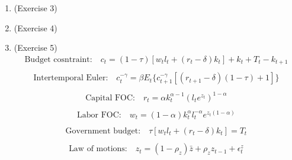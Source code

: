 \documentclass[letterpaper,12pt]{article}
\theoremstyle{definition}
\begin{document}
\begin{enumerate}
	\item(Exercise 3)\\
	
	\item(Exercise 4)\\

	\item(Exercise 5)\\
	\begin{equation} \label{eq1}
	\begin{split}
	\text{Budget cosntraint:} \quad c_{t} = (1 - \tau)[w_{t}l_{t} + (r_{t} - \delta)k_{t}] + k_{t} + T_{t} - k_{t + 1}\\
	\end{split}
	\end{equation}
	\begin{equation} \label{eq2}
	\begin{split}
	\text{Intertemporal Euler:} \quad c_{t}^{-\gamma} = \beta E_{t}\{  c_{t + 1}^{-\gamma}[(r_{t + 1} - \delta)(1 - \tau) + 1]\} \\
	\end{split}
	\end{equation}
	\begin{equation} \label{eq3}
	\begin{split}
	\text{Capital FOC:} \quad r_{t} = \alpha k_{t}^{\alpha - 1} (l_{t}e^{z_{t}})^{1 - \alpha} \\
	\end{split}
	\end{equation}
	\begin{equation} \label{eq4}
	\begin{split}
	\text{Labor FOC:} \quad w_{t} = (1 - \alpha)k_{t}^{\alpha} l_{t}^{- \alpha} e^{z_{t}(1 - \alpha)} \\
	\end{split}
	\end{equation}
	\begin{equation} \label{eq5}
	\begin{split}
	\text{Government budget:} \quad \tau[w_{t}l_{t} + (r_{t} - \delta)k_{t}] = T_{t}  \\
	\end{split}
	\end{equation}
	\begin{equation} \label{eq6}
	\begin{split}
	\text{Law of motions:} \quad z_{t} = (1 - \rho_{z})\bar{z} + \rho_{z}z_{t - 1} + \epsilon_{t}^{z} \\
	\end{split}

\end{equation}
\end{enumerate}
\end{document}
